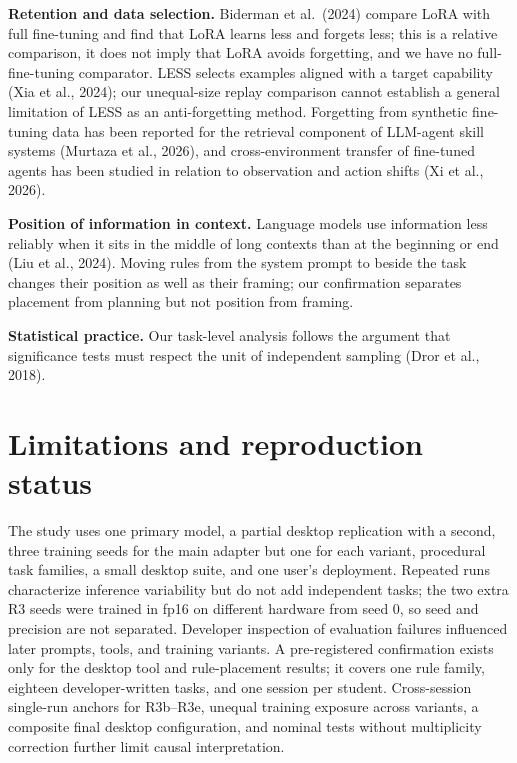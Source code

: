 \documentclass[
  10pt,
]{article}
\begin{document}
\textbf{Retention and data selection.} Biderman et al.~(2024) compare
LoRA with full fine-tuning and find that LoRA learns less and forgets
less; this is a relative comparison, it does not imply that LoRA avoids
forgetting, and we have no full-fine-tuning comparator. LESS selects
examples aligned with a target capability (Xia et al., 2024); our
unequal-size replay comparison cannot establish a general limitation of
LESS as an anti-forgetting method. Forgetting from synthetic fine-tuning
data has been reported for the retrieval component of LLM-agent skill
systems (Murtaza et al., 2026), and cross-environment transfer of
fine-tuned agents has been studied in relation to observation and action
shifts (Xi et al., 2026).

\textbf{Position of information in context.} Language models use
information less reliably when it sits in the middle of long contexts
than at the beginning or end (Liu et al., 2024). Moving rules from the
system prompt to beside the task changes their position as well as their
framing; our confirmation separates placement from planning but not
position from framing.

\textbf{Statistical practice.} Our task-level analysis follows the
argument that significance tests must respect the unit of independent
sampling (Dror et al., 2018).

\section{Limitations and reproduction
status}\label{limitations-and-reproduction-status}

The study uses one primary model, a partial desktop replication with a
second, three training seeds for the main adapter but one for each
variant, procedural task families, a small desktop suite, and one user's
deployment. Repeated runs characterize inference variability but do not
add independent tasks; the two extra R3 seeds were trained in fp16 on
different hardware from seed 0, so seed and precision are not separated.
Developer inspection of evaluation failures influenced later prompts,
tools, and training variants. A pre-registered confirmation exists only
for the desktop tool and rule-placement results; it covers one rule
family, eighteen developer-written tasks, and one session per student.
Cross-session single-run anchors for R3b--R3e, unequal training exposure
across variants, a composite final desktop configuration, and nominal
tests without multiplicity correction further limit causal
interpretation.
\end{document}
